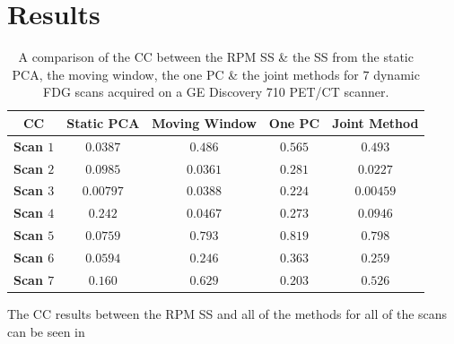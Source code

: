 \section{Results} \label{sec:results}
    \begin{table}
        \centering
        \captionsetup{singlelinecheck=false, justification=centering}
        \caption{A comparison of the \gls{CC} between the \gls{RPM} \gls{SS} \& the \gls{SS} from the static \gls{PCA}, the moving window, the one \gls{PC} \& the joint methods for $7$ dynamic \gls{FDG} scans acquired on a \gls{GE} Discovery 710 \gls{PET}/\gls{CT} scanner.}
        
        \resizebox*{0.75\linewidth}{!}
        {
            \begin{tabular}{||c|cccc||}
                \hline
                \textbf{\gls{CC}} & \textbf{Static \gls{PCA}} & \textbf{Moving Window} & \textbf{One \gls{PC}} & \textbf{Joint Method} \\
                \hline
                \textbf{Scan $1$}   & $0.0387$  & $0.486$  & $0.565$  & $0.493$   \\
                \textbf{Scan $2$}   & $0.0985$  & $0.0361$ & $0.281$  & $0.0227$  \\
                \textbf{Scan $3$}   & $0.00797$ & $0.0388$ & $0.224$  & $0.00459$ \\
                \textbf{Scan $4$}   & $0.242$   & $0.0467$ & $0.273$  & $0.0946$  \\
                \textbf{Scan $5$}   & $0.0759$  & $0.793$  & $0.819$  & $0.798$   \\
                \textbf{Scan $6$}   & $0.0594$  & $0.246$  & $0.363$  & $0.259$   \\
                \textbf{Scan $7$}   & $0.160$   & $0.629$  & $0.203$  & $0.526$   \\
                \hline
            \end{tabular}
        }
        \label{tab:cross_correlation}
    \end{table}
    
    The \gls{CC} results between the \gls{RPM} \gls{SS} and all of the methods for all of the scans can be seen in~
    
